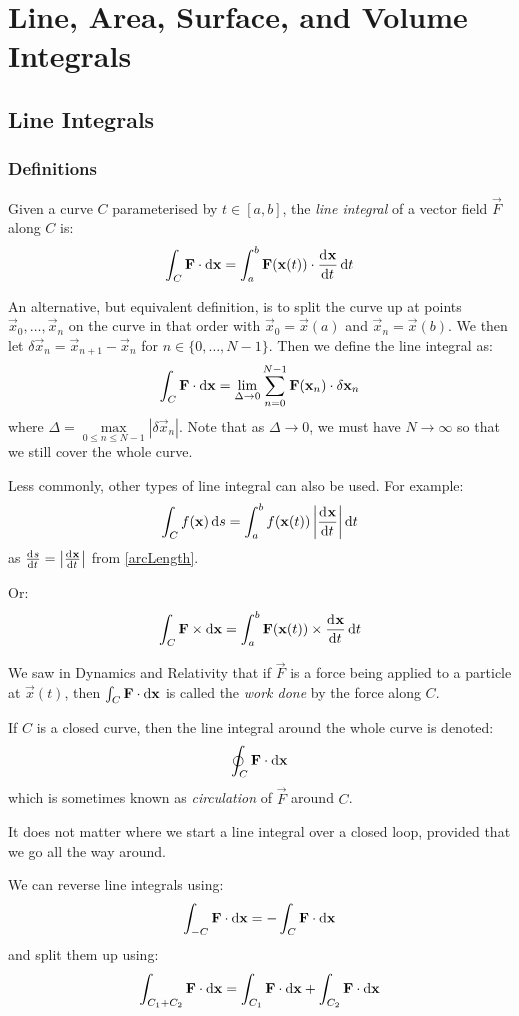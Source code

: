 \documentclass[../main.tex]{subfiles}
\begin{document}
\chapter{Line, Area, Surface, and Volume Integrals}
\section{Line Integrals}
\subsection{Definitions}
\begin{definition}
  Given a curve $C$ parameterised by $t \in [a, b]$, the \textit{line integral} of a vector field $\vec{F}$ along $C$ is:
  \[
    \int_{C} \vec{F} \cdot \d{\vec{x}} = \int_{a}^{b} \vec{F}(\vec{x}(t)) \cdot \deriv{\vec{x}}{t} \d{t}
  \]
\end{definition}
An alternative, but equivalent definition, is to split the curve up at points $\vec{x}_0, \ldots, \vec{x}_n$ on the curve in that order with $\vec{x}_0 = \vec{x}(a)$ and $\vec{x}_n = \vec{x}(b)$.
We then let $\delta \vec{x}_n = \vec{x}_{n + 1} - \vec{x}_n$ for $n \in \{0, \ldots, N - 1\}$.
Then we define the line integral as:
\[
  \int_{C} \vec{F} \cdot \d{\vec{x}} = \lim_{\Delta \to 0} \sum_{n = 0}^{N-1} \vec{F}(\vec{x}_n) \cdot \delta \vec{x}_n
\]
where $\Delta = \max\limits_{0 \leq n \leq N - 1}|\delta \vec{x}_n|$.
Note that as $\Delta \to 0$, we must have $N \to \infty$ so that we still cover the whole curve.
\begin{remark}
  Less commonly, other types of line integral can also be used.
  For example:
  \[
    \int_{C} f(\vec{x}) \d{s} = \int_{a}^{b} f(\vec{x}(t))\abs{\deriv{\vec{x}}{t}} \d{t}
  \]
  as $\deriv{s}{t} = \abs{\deriv{\vec{x}}{t}}$ from \cref{arcLength}.

  Or:
  \[
    \int_{C} \vec{F} \times \d{\vec{x}} = \int_{a}^{b} \vec{F}(\vec{x}(t)) \times \deriv{\vec{x}}{t} \d{t}
  \]
\end{remark}
\begin{remark}
  We saw in Dynamics and Relativity that if $\vec{F}$ is a force being applied to a particle at $\vec{x}(t)$, then $\int_{C} \vec{F} \cdot \d{\vec{x}}$ is called the \textit{work done} by the force along $C$.
\end{remark}
\begin{definition}[Circulation]
If $C$ is a closed curve, then the line integral around the whole curve is denoted:
\[
  \oint_C \vec{F} \cdot \d{\vec{x}}
\]
which is sometimes known as \textit{circulation} of $\vec{F}$ around $C$.
\end{definition}
\begin{remark}
  It does not matter where we start a line integral over a closed loop, provided that we go all the way around.
\end{remark}
We can reverse line integrals using:
\[
  \int_{-C} \vec{F} \cdot \d{\vec{x}} = - \int_{C} \vec{F} \cdot \d{\vec{x}}
\]
and split them up using:
\[
  \int_{C_1 + C_2} \vec{F} \cdot \d{\vec{x}} = \int_{C_1} \vec{F} \cdot \d{\vec{x}} + \int_{C_2} \vec{F} \cdot \d{\vec{x}}
\]
\end{document}

